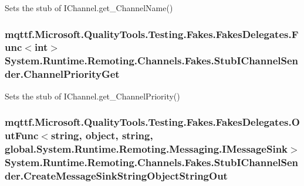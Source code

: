 Sets the stub of I\-Channel.\-get\-\_\-\-Channel\-Name()

\hypertarget{class_system_1_1_runtime_1_1_remoting_1_1_channels_1_1_fakes_1_1_stub_i_channel_sender_a2bbbe842dfde1cc11e019ca54cef569d}{
\subsubsection[{Channel\-Priority\-Get}]{\setlength{\rightskip}{0pt plus 5cm}mqttf.\-Microsoft.\-Quality\-Tools.\-Testing.\-Fakes.\-Fakes\-Delegates.\-Func$<$int$>$ System.\-Runtime.\-Remoting.\-Channels.\-Fakes.\-Stub\-I\-Channel\-Sender.\-Channel\-Priority\-Get}}\label{class_system_1_1_runtime_1_1_remoting_1_1_channels_1_1_fakes_1_1_stub_i_channel_sender_a2bbbe842dfde1cc11e019ca54cef569d}


Sets the stub of I\-Channel.\-get\-\_\-\-Channel\-Priority()

\hypertarget{class_system_1_1_runtime_1_1_remoting_1_1_channels_1_1_fakes_1_1_stub_i_channel_sender_ab15f1ff0c059e2de555b16b1780e9d27}{
\subsubsection[{Create\-Message\-Sink\-String\-Object\-String\-Out}]{\setlength{\rightskip}{0pt plus 5cm}mqttf.\-Microsoft.\-Quality\-Tools.\-Testing.\-Fakes.\-Fakes\-Delegates.\-Out\-Func$<$string, object, string, global.\-System.\-Runtime.\-Remoting.\-Messaging.\-I\-Message\-Sink$>$ System.\-Runtime.\-Remoting.\-Channels.\-Fakes.\-Stub\-I\-Channel\-Sender.\-Create\-Message\-Sink\-String\-Object\-String\-Out}}\label{class_system_1_1_runtime_1_1_remoting_1_1_channels_1_1_fakes_1_1_stub_i_channel_sender_ab15f1ff0c059e2de555b16b1780e9d27}


